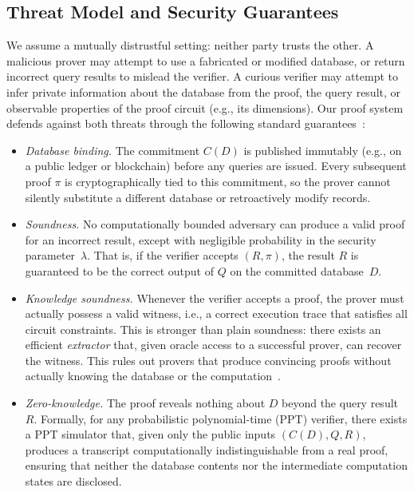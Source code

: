 \documentclass[sigconf]{acmart}
\renewcommand{\emph}[1]{\textit{#1}}
\begin{document}
\subsection{Threat Model and Security Guarantees}

We assume a mutually distrustful setting: neither party trusts the other. A malicious prover may attempt to use a fabricated or modified database, or return incorrect query results to mislead the verifier. A curious verifier may attempt to infer private information about the database from the proof, the query result, or observable properties of the proof circuit (e.g., its dimensions). Our proof system defends against both threats through the following standard guarantees~\cite{groth2016size, gabizon2019plonk}:

\begin{itemize}[leftmargin=*]
    \item \emph{Database binding.} The commitment $C(D)$ is published immutably (e.g., on a public ledger or blockchain) before any queries are issued. Every subsequent proof $\pi$ is cryptographically tied to this commitment, so the prover cannot silently substitute a different database or retroactively modify records.

    \item \emph{Soundness.} No computationally bounded adversary can produce a valid proof for an incorrect result, except with negligible probability in the security parameter~$\lambda$. That is, if the verifier accepts $(R, \pi)$, the result $R$ is guaranteed to be the correct output of $Q$ on the committed database~$D$.

    \item \emph{Knowledge soundness.} Whenever the verifier accepts a proof, the prover must actually possess a valid witness, i.e., a correct execution trace that satisfies all circuit constraints. This is stronger than plain soundness: there exists an efficient \emph{extractor} that, given oracle access to a successful prover, can recover the witness. This rules out provers that produce convincing proofs without actually knowing the database or the computation~\cite{groth2016size}.

    \item \emph{Zero-knowledge.} The proof reveals nothing about $D$ beyond the query result $R$. Formally, for any probabilistic polynomial-time (PPT) verifier, there exists a PPT simulator that, given only the public inputs $(C(D), Q, R)$, produces a transcript computationally indistinguishable from a real proof, ensuring that neither the database contents nor the intermediate computation states are disclosed.
\end{itemize}
\end{document}

